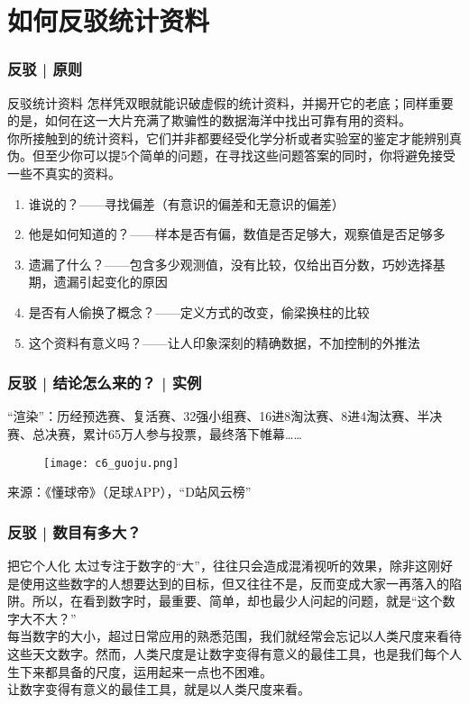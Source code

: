 \section{如何反驳统计资料}
\begin{frame}
  \frametitle{反驳 | 原则}
  \begin{block}{\alert{反驳统计资料}}
    怎样凭双眼就能识破虚假的统计资料，并揭开它的老底；同样重要的是，如何在这一大片充满了欺骗性的数据海洋中找出可靠有用的资料。\\
    \vspace{0.5em}
    你所接触到的统计资料，它们并非都要经受化学分析或者实验室的鉴定才能辨别真伪。但至少你可以提5个简单的问题，在寻找这些问题答案的同时，你将避免接受一些不真实的资料。
    \begin{enumerate}
      \item 谁说的？——寻找偏差（有意识的偏差和无意识的偏差）
      \item 他是如何知道的？——样本是否有偏，数值是否足够大，观察值是否足够多
      \item 遗漏了什么？——包含多少观测值，没有比较，仅给出百分数，巧妙选择基期，遗漏引起变化的原因
      \item 是否有人偷换了概念？——定义方式的改变，偷梁换柱的比较
      \item 这个资料有意义吗？——让人印象深刻的精确数据，不加控制的外推法
    \end{enumerate}
  \end{block}
\end{frame}

\begin{frame}
  \frametitle{反驳 | 结论怎么来的？ | 实例}
  \vspace{-0.5em}
  “渲染”：历经预选赛、复活赛、32强小组赛、16进8淘汰赛、8进4淘汰赛、半决赛、总决赛，累计65万人参与投票，最终落下帷幕……\\
  \vspace{-0.5em}
  \begin{figure}
    \centering
    \texttt{[image: c6\_guoju.png]}
  \end{figure}
  \vspace{-0.5em}
  \pause
  \centering 来源：《懂球帝》（足球APP），“D站风云榜”
\end{frame}

\begin{frame}
  \frametitle{反驳 | 数目有多大？}
  \begin{block}{把它个人化}
  太过专注于数字的“大”，往往只会造成混淆视听的效果，除非这刚好是使用这些数字的人想要达到的目标，但又往往不是，反而变成大家一再落入的陷阱。所以，在看到数字时，最重要、简单，却也最少人问起的问题，就是“这个数字大不大？”\\
  \vspace{0.5em}
  每当数字的大小，超过日常应用的熟悉范围，我们就经常会忘记以人类尺度来看待这些天文数字。然而，\alert{人类尺度是让数字变得有意义的最佳工具}，也是我们每个人生下来都具备的尺度，运用起来一点也不困难。\\
  \vspace{0.5em}
  \alert{让数字变得有意义的最佳工具，就是以人类尺度来看。}
  \end{block}
\end{frame}


